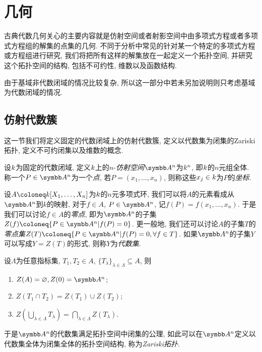
\section{几何}\label{sec:geometry}

古典代数几何关心的主要内容就是仿射空间或者射影空间中由多项式方程或者多项式方程组的解集的点集的几何. 不同于分析中常见的针对某一个特定的多项式方程或方程组进行研究, 我们将把所有这样的解集放在一起定义一个拓扑空间, 并研究这个拓扑空间的结构, 包括不可约性, 维数以及函数结构.

由于基域非代数闭域的情况比较复杂, 所以这一部分中若未另加说明则只考虑基域为代数闭域的情况.

\subsection{仿射代数簇}\label{sec:varietyaffine}

这一节我们将定义固定的代数闭域上的仿射代数簇, 定义以代数集为闭集的Zariski拓扑, 定义不可约闭集以及维数的概念.

设$k$为固定的代数闭域, 定义$k$上的$n$-\emph{仿射空间}$\AF^n$为$k^n$, 即$k$的$n$元组全体. 称一个$P\in \AF^n$为一个\emph{点}, 若$P=(x_1, \dotsc, x_n)$, 则称这些$x_j\in k$为$P$的\emph{坐标}.

设$A\coloneq \kk[X_1, \dotsc, X_n]$为$k$的$n$元多项式环, 我们可以将$A$的元素看成从$\AF^n$到$k$的映射, 对于$f\in A$, $P\in \AF^n$, 记$f(P)=f(x_1, \dotsc, x_n)$. 于是我们可以讨论$f\in A$的\emph{零点}, 即为$\AF^n$的子集$Z(f)\coloneq \{P\in \AF^n\vert f(P)=0\}$. 更一般地, 我们还可以讨论$A$的子集$T$的\emph{零点集}$Z(T)\coloneq \{P\in \AF^n\vert f(P)=0, \forall f\in T\}$. 如果$\AF^n$的子集$Y$可以写成$Y=Z(T)$的形式, 则称$Y$为\emph{代数集}.

\begin{proposition}\label{prop:affinezariskitopology}
    设$\Lambda$为任意指标集, $T_1, T_2\in A$, $\{T_\lambda\}_{\lambda\in\Lambda}\subseteq A$, 则
    \begin{enumerate}
        \item\label{enum:prop-affine-zariski-topology-1} $Z(A)=\varnothing, Z(0)=\AF^n$;
        \item\label{enum:prop-affine-zariski-topology-2} $Z(T_1\cap T_2)=Z(T_1)\cup Z(T_2)$;
        \item\label{enum:prop-affine-zariski-topology-3} $Z(\bigcup_{\lambda\in\Lambda} T_\lambda)=\bigcap_{\lambda\in\Lambda} Z(T_\lambda)$.
    \end{enumerate}
    于是$\AF^n$的代数集满足拓扑空间中闭集的公理, 如此可以在$\AF^n$定义以代数集全体为闭集全体的拓扑空间结构, 称为\emph{Zariski拓扑}.
\end{proposition}

